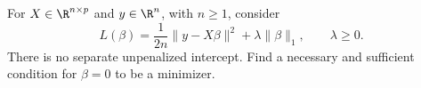 For $X\in\R^{n\times p}$ and $y\in\R^n$, with $n\ge1$, consider
\[
 L(\beta)=\frac1{2n}\|y-X\beta\|^2+\lambda\|\beta\|_1,
 \qquad \lambda\ge0.
\]
There is no separate unpenalized intercept. Find a necessary and sufficient condition for $\beta=0$ to be a minimizer.
